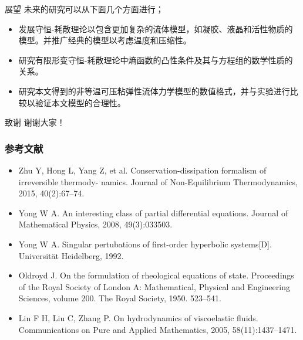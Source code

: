 \documentclass[mathserif]{beamer}
\begin{document}
\begin{frame}{展望}
未来的研究可以从下面几个方面进行；
\begin{itemize}
	\item 发展守恒-耗散理论以包含更加复杂的流体模型，如凝胶、液晶和活性物质的模型。并推广经典的模型以考虑温度和压缩性。
	\item 研究有限形变守恒-耗散理论中熵函数的凸性条件及其与方程组的数学性质的关系。
	\item 研究本文得到的非等温可压粘弹性流体力学模型的数值格式，并与实验进行比较以验证本文模型的合理性。
\end{itemize}
\end{frame}

\begin{frame}{致谢}
谢谢大家！
\end{frame}

\begin{frame}[allowframebreaks]
        \frametitle{参考文献}
        \begin{itemize}
          \item Zhu Y, Hong L, Yang Z, et al. Conservation-dissipation formalism of irreversible thermody-
namics. Journal of Non-Equilibrium Thermodynamics, 2015, 40(2):67–74.
          \item Yong W A. An interesting class of partial differential equations. Journal of Mathematical
Physics, 2008, 49(3):033503.
          \item Yong W A. Singular pertubations of first-order hyperbolic systems[D]. Universität Heidelberg,
1992.
          \item Oldroyd J. On the formulation of rheological equations of state. Proceedings of the Royal
Society of London A: Mathematical, Physical and Engineering Sciences, volume 200. The
Royal Society, 1950. 523–541.
          \item Lin F H, Liu C, Zhang P. On hydrodynamics of viscoelastic fluids. Communications on Pure
and Applied Mathematics, 2005, 58(11):1437–1471.
        \end{itemize}
\end{frame}
\end{document}
